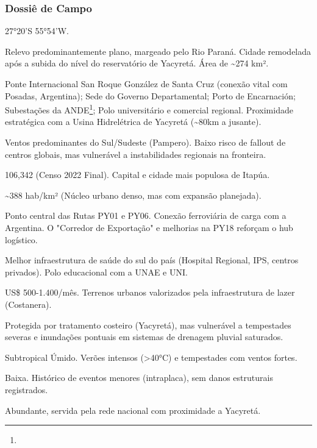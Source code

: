 \subsubsection{Dossiê de Campo}
\begin{description}[style=nextline,leftmargin=0.5cm,font=\bfseries]
\item[Coordenadas]  27°20'S 55°54'W.
\item[Topografia]  Relevo predominantemente plano, margeado pelo Rio Paraná. Cidade remodelada após a subida do nível do reservatório de Yacyretá. Área de \textasciitilde 274 km².
\item[Alvos Estratégicos]  Ponte Internacional San Roque González de Santa Cruz (conexão vital com Posadas, Argentina); Sede do Governo Departamental; Porto de Encarnación; Subestações da ANDE\footnote{\fineANDE}; Polo universitário e comercial regional. Proximidade estratégica com a Usina Hidrelétrica de Yacyretá (\textasciitilde 80km a jusante).
\item[Fallout]  Ventos predominantes do Sul/\allowbreak Sudeste (Pampero). Baixo risco de fallout de centros globais, mas vulnerável a instabilidades regionais na fronteira.
\item[População]  106,342 (Censo 2022 Final). Capital e cidade mais populosa de Itapúa.
\item[Densidade]  \textasciitilde 388 hab/\allowbreak km² (Núcleo urbano denso, mas com expansão planejada).
\item[Vias de Acesso]  Ponto central das Rutas PY01 e PY06. Conexão ferroviária de carga com a Argentina. O "Corredor de Exportação" e melhorias na PY18 reforçam o hub logístico.
\item[Serviços]  Melhor infraestrutura de saúde do sul do país (Hospital Regional, IPS, centros privados). Polo educacional com a UNAE e UNI.
\item[Custo de Vida]  US\$ 500-1.400/\allowbreak mês. Terrenos urbanos valorizados pela infraestrutura de lazer (Costanera).
\item[Hidrologia]  Protegida por tratamento costeiro (Yacyretá), mas vulnerável a tempestades severas e inundações pontuais em sistemas de drenagem pluvial saturados.
\item[Clima]  Subtropical Úmido. Verões intensos (>40°C) e tempestades com ventos fortes.
\item[Sismicidade]  Baixa. Histórico de eventos menores (intraplaca), sem danos estruturais registrados.
\item[Energia]  Abundante, servida pela rede nacional com proximidade a Yacyretá.

\end{description}
